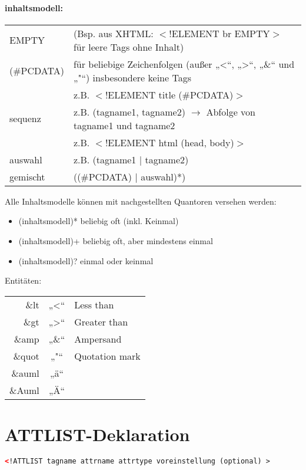 \paragraph{inhaltsmodell:}\hspace*{0,5mm}\linebreak
\begin{tabularx}{\textwidth}{lX}
  EMPTY & (Bsp. aus XHTML: $<$!ELEMENT br EMPTY$>$ für leere Tags ohne Inhalt)\\
  (\#PCDATA) & für beliebige Zeichenfolgen (außer „\textless“, „\textgreater“, „\&“ und „"“) insbesondere keine Tags\\
   & z.B. $<$!ELEMENT title (\#PCDATA)$>$\\
  sequenz & z.B. (tagname1, tagname2) $\rightarrow$ Abfolge von tagname1 und tagname2\\
   & z.B. $<$!ELEMENT html (head, body)$>$\\
  auswahl & z.B. (tagname1 | tagname2)\\
  gemischt & ((\#PCDATA) | auswahl)*)  
\end{tabularx}
\vspace*{2mm}

Alle Inhaltsmodelle können mit nachgestellten Quantoren versehen werden:
\begin{itemize}
\item (inhaltsmodell)* beliebig oft (inkl. Keinmal)
\item (inhaltsmodell)+	beliebig oft, aber mindestens einmal
\item (inhaltsmodell)?	einmal oder keinmal
\end{itemize}
\vspace*{2mm}

Entitäten:\\
\begin{tabularx}{\textwidth}{rcX}
  \&lt & „\textless“ & Less than\\
  \&gt & „\textgreater“ & Greater than\\
  \&amp	& „\&“	& Ampersand\\
  \&quot & „"“ & Quotation mark\\
  \&auml & „ä“ & \\
  \&Auml & „Ä“ & \\	
\end{tabularx}

\newpage
\section{ATTLIST-Deklaration}
\begin{lstlisting}[caption={Syntax einer ATTLIST-Deklaration}, label={lst:attlist}, language={XML}]
  <!ATTLIST tagname attrname attrtype voreinstellung (optional) > 
\end{lstlisting}
